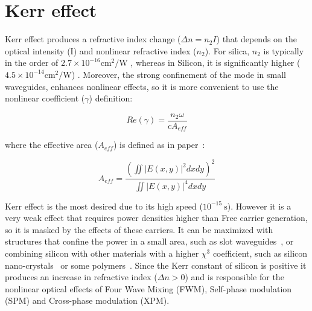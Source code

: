 \section{Kerr effect}

Kerr effect produces a refractive index change ($\Delta n = n_2 I$) that depends on the optical intensity (I) and nonlinear refractive index ($n_2$). For silica, $n_2$ is typically in the order of $2.7\times10^{-16} \mathrm{cm^2/W}$ , whereas in Silicon, it is significantly higher ($4.5\times10^{-14} \mathrm{cm^2/W}$) \cite{Dinu2003a}.
Moreover, the strong confinement of the mode in small waveguides, enhances nonlinear effects, so it is more convenient to use the nonlinear coefficient ($\gamma$) definition:

\begin{equation}
 Re(\gamma) = \frac{n_2\omega}{cA_{eff}}
\label{eq:gamma}
\end{equation}

where the effective area ($A_{eff}$) is defined as in paper~\cite{Rukhlenko2012}:

\begin{equation} 
  A_{eff}= \frac{(\iint |E(x,y)|^2 dxdy)^2}{\iint |E(x,y)|^4 dxdy}
\label{eq:aeff}
\end{equation}


Kerr effect is the most desired due to its high speed ($10^{-15}~\mathrm{s}$).
However it is a very weak effect that requires power densities higher than Free carrier generation, so it is masked by the effects of these carriers.
It can be maximized with structures that confine the power in a small area, such as slot waveguides~\cite{Martinez2010}, or combining silicon with other materials with a higher $\chi^3$ coefficient, such as silicon nano-crystals~\cite{Spano2009} or some polymers~\cite{Koos2009}.
Since the Kerr constant of silicon is positive it produces an increase in refractive index ($\Delta n > 0$) and is responsible for the nonlinear optical effects of Four Wave Mixing (FWM), Self-phase modulation (SPM) and Cross-phase modulation (XPM).

